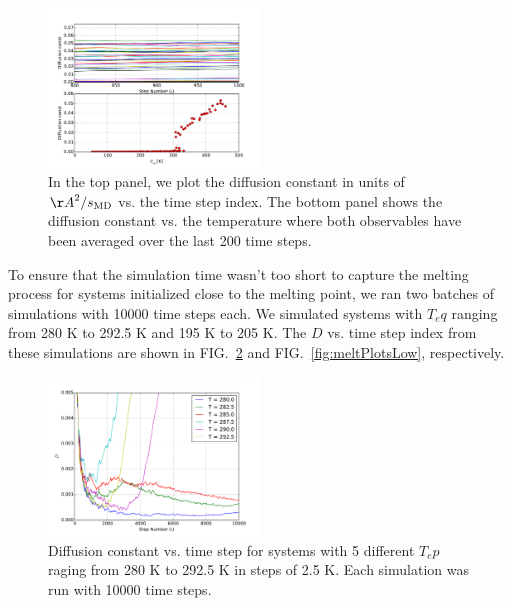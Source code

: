 \documentclass[10pt,showpacs,preprintnumbers,footinbib,amsmath,amssymb,aps,prl,twocolumn,groupedaddress,superscriptaddress,showkeys]{revtex4-1}
\begin{document}
\begin{figure}
\centering
	\includegraphics[width=0.5\textwidth]{figures/DavgDplots.pdf}
	\caption{In the top panel, we plot the diffusion constant
	in units of ${\AA} ^2 / s_{\mathrm{MD}}$ vs.
	the time step index. The bottom panel shows the diffusion
	constant vs. the temperature where both observables have
	been averaged over the last 200 time steps.}
	\label{fig:DavgDplots}
\end{figure}

To ensure that the
simulation time wasn't too short to capture the melting process for
systems initialized close to the melting point, we ran two 
batches of simulations with 10000 time steps each. We simulated
systems with $T_eq$ ranging from 280 K to 292.5 K and 195 K to 205 K.
The $D$ vs. time step index from these simulations are shown in
FIG.~\ref{fig:meltPlotsHigh} and FIG.~\ref{fig:meltPlotsLow},
respectively.

\begin{figure}
\centering
	\includegraphics[width=0.5\textwidth]{figures/meltPlots.pdf}
	\caption{Diffusion constant vs. time step for systems with 5
	different $T_ep$ raging from 280 K to 292.5 K in steps of 2.5 K. Each
	simulation was run with 10000 time steps.}
	\label{fig:meltPlotsHigh}
\end{figure}
\end{document}
